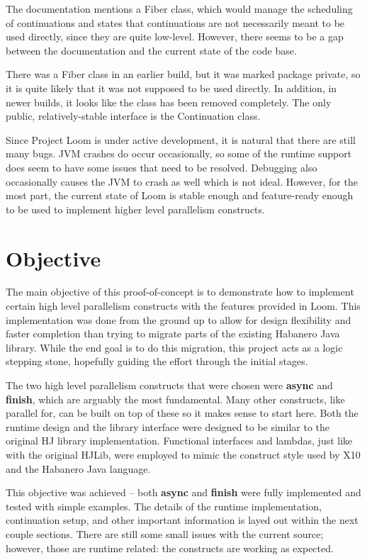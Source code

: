 \documentclass[12pt]{article}
\begin{document}
    The documentation mentions a Fiber class, which would manage the scheduling of continuations and states
    that continuations are not necessarily meant to be used directly, since they are quite low-level.
    However, there seems to be a gap between the documentation and the current state of the code base. 

    There was a Fiber class in an earlier build, but it was marked package private, so it is quite likely
    that it was not supposed to be used directly. In addition, in newer builds, it looks like the class has
    been removed completely. The only public, relatively-stable interface is the Continuation class. 

    Since Project Loom is under active development, it is natural that there are still many bugs. JVM crashes
    do occur occasionally, so some of the runtime support does seem to have some issues that need to be
    resolved. Debugging also occasionally causes the JVM to crash as well which is not ideal. However, for
    the most part, the current state of Loom is stable enough and feature-ready enough to be used to
    implement higher level parallelism constructs.

    \section{Objective}

    The main objective of this proof-of-concept is to demonstrate how to implement certain high level
    parallelism constructs with the features provided in Loom. This implementation was done from the ground
    up to allow for design flexibility and faster completion than trying to migrate parts of the existing
    Habanero Java library. While the end goal is to do this migration, this project acts as a logic stepping
    stone, hopefully guiding the effort through the initial stages.

    The two high level parallelism constructs that were chosen were \textbf{async} and \textbf{finish}, which
    are arguably the most fundamental. Many other constructs, like parallel for, can be built on top of these
    so it makes sense to start here. Both the runtime design and the library interface were designed to be
    similar to the original HJ library implementation. Functional interfaces and lambdas, just like with the
    original HJLib, were employed to mimic the construct style used by X10 and the Habanero Java language.

    This objective was achieved -- both \textbf{async} and \textbf{finish} were fully implemented and tested
    with simple examples. The details of the runtime implementation, continuation setup, and other important
    information is layed out within the next couple sections. There are still some small issues with the
    current source; however, those are runtime related: the constructs are working as expected. 
\end{document}
